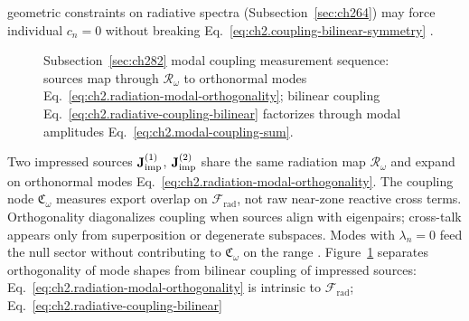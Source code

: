 geometric constraints on radiative spectra (Subsection~\ref{sec:ch264}) may force individual \(c_n=0\) without
breaking Eq.~\eqref{eq:ch2.coupling-bilinear-symmetry} \cite{harrington2001}.
\begin{figure}[t]
\centering
{}
\caption{Subsection~\ref{sec:ch282} modal coupling measurement sequence: sources map through
\(\mathcal{R}_\omega\) to orthonormal modes Eq.~\eqref{eq:ch2.radiation-modal-orthogonality};
bilinear coupling Eq.~\eqref{eq:ch2.radiative-coupling-bilinear} factorizes through modal
amplitudes Eq.~\eqref{eq:ch2.modal-coupling-sum}.}
\label{fig:ch2.modal-coupling-measurement chain}
\end{figure}
Two impressed sources $\mathbf{J}_{\mathrm{imp}}^{(1)}$, $\mathbf{J}_{\mathrm{imp}}^{(2)}$ share the same radiation map $\mathcal{R}_\omega$ and expand on orthonormal modes Eq.~\eqref{eq:ch2.radiation-modal-orthogonality}. The coupling node $\mathfrak{C}_\omega$ measures export overlap on $\mathcal{F}_{\mathrm{rad}}$, not raw near-zone reactive cross terms. Orthogonality diagonalizes coupling when sources align with eigenpairs; cross-talk appears only from superposition or degenerate subspaces. Modes with $\lambda_n=0$ feed the null sector without contributing to $\mathfrak{C}_\omega$ on the range \cite{stratton1941}. Figure~\ref{fig:ch2.modal-coupling-measurement chain} separates orthogonality of mode shapes from
bilinear coupling of impressed sources: Eq.~\eqref{eq:ch2.radiation-modal-orthogonality} is
intrinsic to \(\mathcal{F}_{\mathrm{rad}}\); Eq.~\eqref{eq:ch2.radiative-coupling-bilinear}
